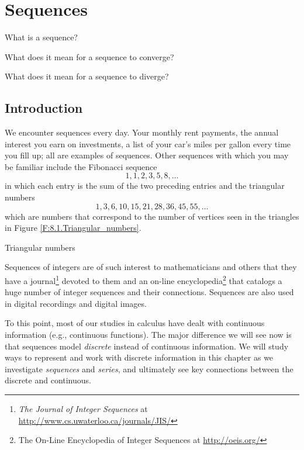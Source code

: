 \section{Sequences} \label{S:7.1.Sequences}

\begin{goals}
\item What is a sequence?
\item What does it mean for a sequence to converge?
\item What does it mean for a sequence to diverge?
\end{goals}

\subsection*{Introduction}

We encounter sequences every day. Your monthly rent payments, the annual interest you earn on investments, a list of your car's miles per gallon every time you fill up; all are examples of sequences. Other sequences with which you may be familiar include the Fibonacci sequence
\[1, 1, 2, 3, 5, 8, \ldots\]
in which each entry is the sum of the two preceding entries and the triangular numbers
\[1, 3, 6, 10, 15, 21, 28, 36, 45, 55, \ldots\]
which are numbers that correspond to the number of vertices seen in the triangles in Figure \ref{F:8.1.Triangular_numbers}.
\begin{marginfigure}[-4cm] %
\caption{Triangular numbers}
\label{F:8.1.Triangular_numbers}
\end{marginfigure}
Sequences of integers are of such interest to mathematicians and others that they have a journal\footnote{\emph{The Journal of Integer Sequences} at \url{http://www.cs.uwaterloo.ca/journals/JIS/}} devoted to them and an on-line encyclopedia\footnote{The On-Line Encyclopedia of Integer Sequences at \url{http://oeis.org/}} that catalogs a huge number of integer sequences and their connections. Sequences are also used in digital recordings and digital images. 

To this point, most of our studies in calculus have dealt with continuous information (e.g., continuous functions). The major difference we will see now is that sequences model \emph{discrete} instead of continuous information. We will study ways to represent and work with discrete information in this chapter as we investigate \emph{sequences} and \emph{series}, and ultimately see key connections between the discrete and continuous.

